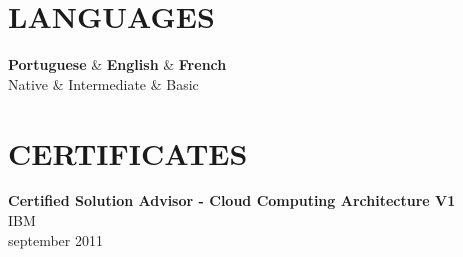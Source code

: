 \documentclass[margin=<value>,11pt]{res} %
\begin{document}
\begin{resume}
\section{LANGUAGES}
	\begin{ncolumn}{3}
	{\bf Portuguese} & {\bf English}        & {\bf French} \\
	Native    & Intermediate & Basic  \\
	\end{ncolumn}



\section{CERTIFICATES}
{\bf Certified Solution Advisor - Cloud Computing Architecture V1}\\
IBM\\
september 2011

\end{resume} 
\end{document}
